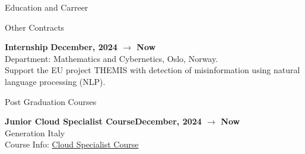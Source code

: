 \documentclass{resume} %
\begin{document}
\begin{rSection}{Education and Carreer}


%
%


        \begin{rSubsection2}{Other Contracts}

            \item\textbf{ Internship }\hfill \textbf{December, 2024 $\rightarrow$ Now}
            \\Department: Mathematics and Cybernetics, Oslo, Norway.
            \\Support the EU project THEMIS with detection of misinformation using natural language processing (NLP).

        \end{rSubsection2}

        \begin{rSubsection2}{Post Graduation Courses}

            \item\textbf{Junior Cloud Specialist Course}\hfill \textbf{December, 2024 $\rightarrow$ Now}
            \\Generation Italy
            \\Course Info: \href{https://italy.generation.org/programs/cloud-specialist/}{Cloud Specialist Course}

        \end{rSubsection2}

    \end{rSection}
\end{document}
